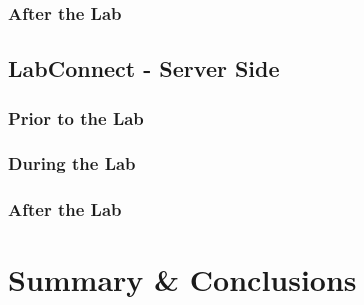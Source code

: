 \documentclass[a4paper, 12pt]{article}
\begin{document}
    \subsubsection{After the Lab}
    
    \subsection{LabConnect - Server Side}

    \subsubsection{Prior to the Lab}
    
    
    \subsubsection{During the Lab}
    
    
    \subsubsection{After the Lab}
    
    
    \section{Summary \& Conclusions}
    
    
    \printbibliography
    
\end{document}
